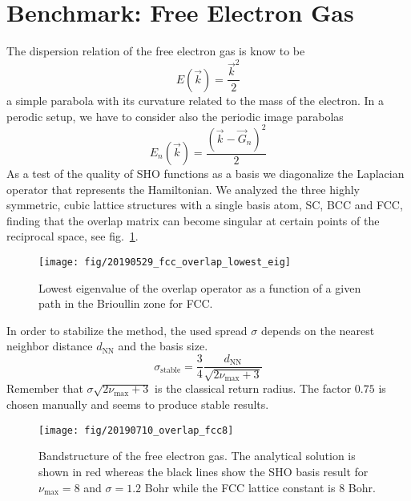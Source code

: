 \documentclass[oribibl]{llncs}
\newcommand{\um}[1]{_{\mathrm{#1}}}
\begin{document}
\section{Benchmark: Free Electron Gas}
The dispersion relation of the free electron gas is know to be
\begin{equation}
	E(\vec k)= \frac {\vec k^2} 2
\end{equation}
a simple parabola with its curvature related to the mass of the electron.
In a perodic setup, we have to consider also the periodic image parabolas
\begin{equation}
	E_n(\vec k) = \frac {(\vec k - \vec G_n)^2} 2
\end{equation}
As a test of the quality of \ac{SHO} functions as a basis
we diagonalize the Laplacian operator that represents the
Hamiltonian.
We analyzed the three highly symmetric, cubic lattice structures with a single basis atom,
SC, BCC and FCC, finding that the overlap matrix can become singular at certain points of
the reciprocal space, see fig.~\ref{fig:overlap_lowest_eig}.
%
\begin{figure}
  \begin{minipage}[c]{.990\textwidth}
	\texttt{[image: fig/20190529\_fcc\_overlap\_lowest\_eig]} %
  \end{minipage}\hfill
  \begin{minipage}[c]{.009\textwidth}
  \end{minipage}
  \label{fig:overlap_lowest_eig}
  \caption{
	Lowest eigenvalue of the overlap operator as a function of a given path in the Brioullin zone for FCC.
  }
\end{figure}
%
%
In order to stabilize the method, the used spread $\sigma$ depends on the nearest neighbor distance $d\um{NN}$
and the basis size.
\begin{equation}
	\sigma\um{stable} = \frac34 \frac{ d\um{NN} }{ \sqrt{2 \nu\um{max} + 3} }
\end{equation}
Remember that $\sigma \sqrt{2 \nu\um{max} + 3}$ is the classical return radius.
The factor $0.75$ is chosen manually and seems to produce stable results.
%
\begin{figure}
  \begin{minipage}[c]{.990\textwidth}
	\texttt{[image: fig/20190710\_overlap\_fcc8]} %
  \end{minipage}\hfill
  \begin{minipage}[c]{.009\textwidth}
  \end{minipage}
  \label{fig:overlap_fcc8}
  \caption{
	Bandstructure of the free electron gas. The analytical solution is shown in red
	whereas the black lines show the \ac{SHO} basis result for $\nu\um{max} = 8$ and $\sigma = 1.2$ Bohr 
	while the FCC lattice constant is $8$ Bohr.
  }
\end{figure}
\end{document}
